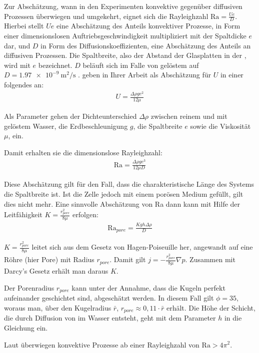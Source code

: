 Zur Abschätzung, wann in den \HSCsm Experimenten konvektive gegenüber diffusiven Prozessen überwiegen und umgekehrt, eignet sich die Rayleighzahl $\mathrm{Ra} = \frac{Ue}{D}$. Hierbei stellt $Ue$ eine Abschätzung des Anteils konvektiver Prozesse, in Form einer dimensionslosen Auftriebsgeschwindigkeit multipliziert mit der Spaltdicke $e$ dar, und $D$ in Form des Diffusionskoeffizienten, eine Abschätzung des Anteils an diffusiven Prozessen. Die Spaltbreite, also der Abstand der Glasplatten in der \HSCn, wird mit $e$ bezeichnet.
$D$ beläuft sich im Falle von gelöstem \COT auf $D = \SI{1,97e-9}{\meter\squared\per\second}$ \citep{frank}.
\cite{fernandez} geben in Ihrer Arbeit als Abschätzung für $U$ in einer \HSC folgendes an:
\begin{align}
 U = \frac{\Delta\rho g e^2}{12 \mu}
 \label{eq:U}
\end{align}

Als Parameter gehen der Dichteunterschied $\Delta\rho$ zwischen reinem und mit \COT gelöstem Wasser, die Erdbeschleunigung $g$, die Spaltbreite $e$ sowie die Viskosität $\mu$, ein.

Damit erhalten sie die dimensionslose Rayleighzahl:
\begin{align}
 \mathrm{Ra} = \frac{\Delta\rho g e^3}{12 \mu D}
 \label{eq:Ra1}
\end{align}


Diese Abschätzung gilt für den Fall, dass die charakteristische Länge des Systems die Spaltbreite ist. Ist die Zelle jedoch mit einem porösen Medium gefüllt, gilt dies nicht mehr.
Eine sinnvolle Abschätzung von Ra dann kann mit Hilfe der Leitfähigkeit $K = \frac{r_{pore}^2}{8\mu}$ erfolgen:
\begin{align}
 \mathrm{Ra}_{pore} = \frac{K g h \Delta \rho}{D}
 \label{eq:Ra2}
\end{align}

$K = \frac{r_{pore}^2}{8\mu}$ leitet sich aus dem Gesetz von Hagen-Poiseuille her, angewandt auf eine Röhre (hier Pore) mit Radius $r_{pore}$. Damit gilt $j = -\frac{r_{pore}^2}{8\mu} \nabla p$. Zusammen mit Darcy's Gesetz erhält man daraus $K$.

Der Porenradius $r_{pore}$ kann unter der Annahme, dass die Kugeln perfekt aufeinander geschichtet sind, abgeschätzt werden. In diesem Fall gilt $\phi=35$, woraus man, über den Kugelradius $\bar{r}$, $r_{pore} \approx 0,11 \cdot \bar{r}$ erhält.
Die Höhe der Schicht, die durch Diffusion von \COT im Wasser entsteht, geht mit dem Parameter $h$ in die Gleichung ein.

Laut \cite{kneafsy} überwiegen konvektive Prozesse ab einer Rayleighzahl von $\mathrm{Ra} > 4\pi^2$. 